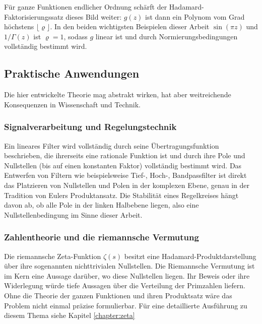 Für ganze Funktionen endlicher Ordnung schärft der Hadamard-Faktorisierungssatz
dieses Bild weiter:
$g(z)$ ist dann ein Polynom vom Grad höchstens $\lfloor \varrho \rfloor$.
In den beiden wichtigsten Beispielen dieser Arbeit
$\sin(\pi z)$ und $1/\Gamma(z)$ ist $\varrho = 1$,
sodass $g$ linear ist und durch Normierungsbedingungen vollständig bestimmt wird.

\subsection{Praktische Anwendungen}

Die hier entwickelte Theorie mag abstrakt wirken, hat aber weitreichende
Konsequenzen in Wissenschaft und Technik.

\subsubsection{Signalverarbeitung und Regelungstechnik}
Ein lineares Filter wird vollständig durch seine Übertragungsfunktion beschrieben,
die ihrerseits eine rationale Funktion ist und durch ihre Pole und Nullstellen
(bis auf einen konstanten Faktor) vollständig bestimmt wird.
Das Entwerfen von Filtern wie beispielsweise Tief-, Hoch-, Bandpassfilter ist direkt das Platzieren
%
%
%
von Nullstellen und Polen in der komplexen Ebene,
genau in der Tradition von Eulers Produktansatz.
Die Stabilität eines Regelkreises hängt davon ab, ob alle Pole in der linken
Halbebene liegen, also eine Nullstellenbedingung im Sinne dieser Arbeit.
%
%

\subsubsection{Zahlentheorie und die riemannsche Vermutung}
Die riemannsche Zeta-Funktion $\zeta(s)$ besitzt eine Hadamard-Produktdarstellung
%
%
über ihre sogenannten nichttrivialen Nullstellen.
Die Riemannsche Vermutung ist im Kern eine Aussage darüber, wo diese Nullstellen liegen.
Ihr Beweis oder ihre Widerlegung würde tiefe Aussagen über die Verteilung
der Primzahlen liefern.
Ohne die Theorie der ganzen Funktionen und ihren Produktsatz wäre das Problem
nicht einmal präzise formulierbar.
Für eine detaillierte Ausführung zu diesem Thema siehe Kapitel \ref{chapter:zeta}

